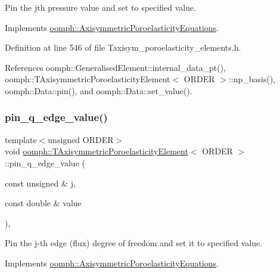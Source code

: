 Pin the jth pressure value and set to specified value. 



Implements \hyperlink{classoomph_1_1AxisymmetricPoroelasticityEquations_aa38488da8fec869f377a39c5c0da4311}{oomph\+::\+Axisymmetric\+Poroelasticity\+Equations}.



Definition at line 546 of file Taxisym\+\_\+poroelasticity\+\_\+elements.\+h.



References oomph\+::\+Generalised\+Element\+::internal\+\_\+data\+\_\+pt(), oomph\+::\+T\+Axisymmetric\+Poroelasticity\+Element$<$ O\+R\+D\+E\+R $>$\+::np\+\_\+basis(), oomph\+::\+Data\+::pin(), and oomph\+::\+Data\+::set\+\_\+value().

\mbox{\label{classoomph_1_1TAxisymmetricPoroelasticityElement_ab70396f50ef5db1cc9162637a72ae8c2}} 
\subsubsection{\texorpdfstring{pin\+\_\+q\+\_\+edge\+\_\+value()}{pin\_q\_edge\_value()}}
{\footnotesize\ttfamily template$<$unsigned O\+R\+D\+ER$>$ \\
void \hyperlink{classoomph_1_1TAxisymmetricPoroelasticityElement}{oomph\+::\+T\+Axisymmetric\+Poroelasticity\+Element}$<$ O\+R\+D\+ER $>$\+::pin\+\_\+q\+\_\+edge\+\_\+value (\begin{DoxyParamCaption}\item[{const unsigned \&}]{j,  }\item[{const double \&}]{value }\end{DoxyParamCaption})\hspace{0.3cm}{\ttfamily [inline]}, {\ttfamily [virtual]}}



Pin the j-\/th edge (flux) degree of freedom and set it to specified value. 



Implements \hyperlink{classoomph_1_1AxisymmetricPoroelasticityEquations_acf1c7d9fce77306a33838bfc55d899a3}{oomph\+::\+Axisymmetric\+Poroelasticity\+Equations}.



